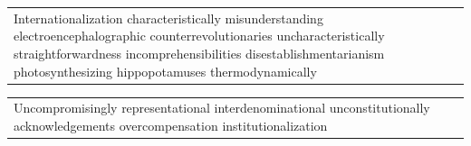 \documentclass{article}
\begin{document}
\begin{tabular}{p{3cm}}
Internationalization characteristically misunderstanding electroencephalographic counterrevolutionaries uncharacteristically straightforwardness incomprehensibilities disestablishmentarianism photosynthesizing hippopotamuses thermodynamically
\end{tabular}

\begin{tabular}{p{3cm}}
Uncompromisingly representational interdenominational unconstitutionally acknowledgements overcompensation institutionalization
\end{tabular}
\end{document}
